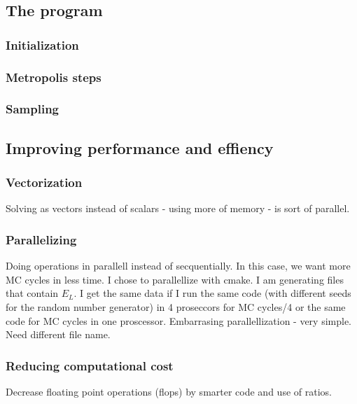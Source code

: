 \subsection{The program}

\subsubsection{Initialization}

\subsubsection{Metropolis steps}

\subsubsection{Sampling}

\subsection{Improving performance and effiency}

\subsubsection{Vectorization}

Solving as vectors instead of scalars - using more of memory - is sort of parallel. 

\subsubsection{Parallelizing}

Doing operations in parallell instead of secquentially. In this case, we want more MC cycles in less time. I chose to parallellize with cmake. I am generating files that contain $E_L$. I get the same data if I run the same code (with different seeds for the random number generator) in 4 proseccors for MC cycles/4 or the same code for MC cycles in one proscessor. Embarrasing parallellization - very simple. Need different file name. 

\subsubsection{Reducing computational cost}

Decrease floating point operations (flops) by smarter code and use of ratios.